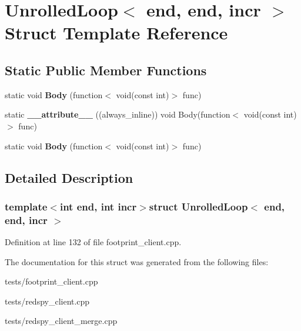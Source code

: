 \hypertarget{structUnrolledLoop_3_01end_00_01end_00_01incr_01_4}{\section{Unrolled\-Loop$<$ end, end, incr $>$ Struct Template Reference}
\label{structUnrolledLoop_3_01end_00_01end_00_01incr_01_4}
}
\subsection*{Static Public Member Functions}
\begin{DoxyCompactItemize}
\item 
\hypertarget{structUnrolledLoop_3_01end_00_01end_00_01incr_01_4_a0c6f8c87d8ed09e05210e9f76c3ab497}{static void {\bfseries Body} (function$<$ void(const int)$>$ func)}\label{structUnrolledLoop_3_01end_00_01end_00_01incr_01_4_a0c6f8c87d8ed09e05210e9f76c3ab497}

\item 
\hypertarget{structUnrolledLoop_3_01end_00_01end_00_01incr_01_4_a3e9badb714fab44ffe7904e2b6a231b6}{static {\bfseries \-\_\-\-\_\-attribute\-\_\-\-\_\-} ((always\-\_\-inline)) void Body(function$<$ void(const int)$>$ func)}\label{structUnrolledLoop_3_01end_00_01end_00_01incr_01_4_a3e9badb714fab44ffe7904e2b6a231b6}

\item 
\hypertarget{structUnrolledLoop_3_01end_00_01end_00_01incr_01_4_a0c6f8c87d8ed09e05210e9f76c3ab497}{static void {\bfseries Body} (function$<$ void(const int)$>$ func)}\label{structUnrolledLoop_3_01end_00_01end_00_01incr_01_4_a0c6f8c87d8ed09e05210e9f76c3ab497}

\end{DoxyCompactItemize}


\subsection{Detailed Description}
\subsubsection*{template$<$int end, int incr$>$struct Unrolled\-Loop$<$ end, end, incr $>$}



Definition at line 132 of file footprint\-\_\-client.\-cpp.



The documentation for this struct was generated from the following files\-:\begin{DoxyCompactItemize}
\item 
tests/footprint\-\_\-client.\-cpp\item 
tests/redspy\-\_\-client.\-cpp\item 
tests/redspy\-\_\-client\-\_\-merge.\-cpp\end{DoxyCompactItemize}
